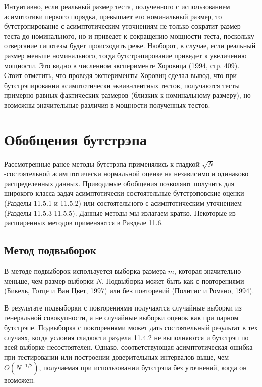 Интуитивно, если реальный размер теста, полученного с использованием асимптотики первого порядка, превышает его номинальный размер, то бутстрэпирование с асимптотическим уточнениям не только  сократит размер теста до номинального, но и приведет к сокращению мощности теста, поскольку отвергание гипотезы будет  происходить реже. Наоборот, в случае, если реальный размер меньше номинального, тогда бутстрэпирование приведет к увеличению мощности. Это видно в численном эксперименте Хоровица (1994, стр. 409). Стоит отметить, что проведя эксперименты Хоровиц сделал вывод, что при  бутстрэпировании асимптотически эквивалентных тестов, получаются тесты примерно равных фактических размеров  (близких к номинальному размеру), но возможны значительные различия в мощности полученных тестов. 


\section{Обобщения бутстрэпа}

Рассмотренные ранее методы бутстрэпа применялись к гладкой $\sqrt{N}$-состоятельной асимптотически нормальной оценке на независимо и одинаково распределенных данных. Приводимые обобщения позволяют получить для широкого класса задач асимптотически состоятельные бутстрэповские оценки (Разделы 11.5.1 и 11.5.2) или состоятельного с асимптотическим уточнением (Разделы 11.5.3-11.5.5). Данные методы мы излагаем кратко. Некоторые из расширенных методов применяются в Разделе 11.6.

\subsection{Метод подвыборок}

В методе подвыборок используется выборка размера $m$, которая значительно меньше, чем размер выборки $N$. Подвыборка может быть как с повторениями (Бикель, Готце и Ван Цвет, 1997) или без повторений (Политис и Романо, 1994).

В результате подвыборки с повторениями получаются случайные выборки из  генеральной совокупности, а не случайные выборки оценок как  при парном бутстрэпе. Подвыборка с повторениями может дать состоятельный результат в тех случаях, когда условия гладкости раздела 11.4.2 не выполняются и  бутстрэп по всей выборке несостоятелен. Однако, соответствующая асимптотическая ошибка при тестировании или построении  доверительных интервалов выше, чем $O(N^{-1/2})$, получаемая при использовании бутстрэпа без уточнений, когда он возможен.

